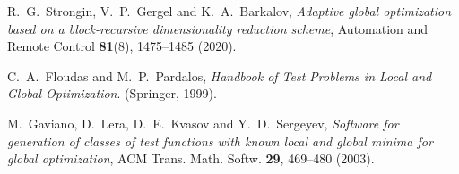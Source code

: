\documentclass[
11pt,%
tightenlines,%
twoside,%
onecolumn,%
nofloats,%
nobibnotes,%
nofootinbib,%
superscriptaddress,%
noshowpacs,%
centertags]%
{revtex4}
\begin{document}
\begin{thebibliography}{99}
R.~G.~Strongin, V.~P.~Gergel and K.~A.~Barkalov, \textit{Adaptive global optimization based on a block-recursive dimensionality reduction scheme}, Automation and Remote Control \textbf{81}(8), 1475--1485 (2020).

C.~A.~Floudas and M.~P.~Pardalos,  \textit{Handbook of Test Problems in Local and Global Optimization}. (Springer, 1999).  %

M.~Gaviano, D.~Lera, D.~E.~Kvasov and Y.~D.~Sergeyev, \textit{Software for generation of classes of test functions with known local and global minima for global optimization}, ACM Trans. Math. Softw. \textbf{29}, 469--480 (2003).


%
%
%
%
%
%
%
%
%
%
%

\end{thebibliography}
\end{document}
